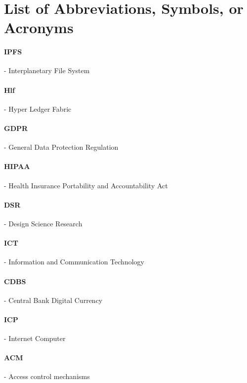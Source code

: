 \listoffigures
\newpage

\listoftables
\newpage

\section{List of Abbreviations, Symbols, or Acronyms}

\paragraph{IPFS} - Interplanetary File System

\paragraph{Hlf} - Hyper Ledger Fabric

\paragraph{GDPR} - General Data Protection Regulation

\paragraph{HIPAA} - Health Insurance Portability and Accountability Act

\paragraph{DSR} - Design Science Research

\paragraph{ICT} - Information and Communication Technology

\paragraph{CDBS} - Central Bank Digital Currency

\paragraph{ICP} - Internet Computer

\paragraph{ACM} - Access control mechanisms 


